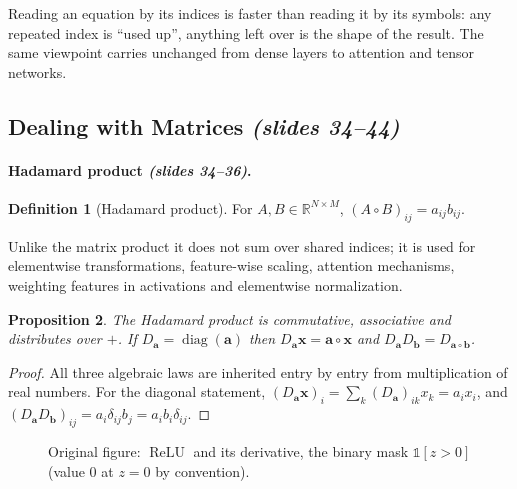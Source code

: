 \documentclass[11pt,a4paper]{article}
\newcommand{\R}{\mathbb{R}}
\newcommand{\diag}{\operatorname{diag}}
\newcommand{\ReLU}{\operatorname{ReLU}}
\newcommand{\ind}[1]{\mathbb{1}\!\left[#1\right]}
\newcommand{\slides}[1]{\texorpdfstring{\emph{(slides #1)}}{(slides #1)}}
\newcommand{\Had}{\circ}
\theoremstyle{definition}
\newtheorem{definition}{Definition}[section]
\theoremstyle{plain}
\newtheorem{proposition}[definition]{Proposition}
\begin{document}
\begin{intuition}
Reading an equation by its indices is faster than reading it by its symbols: any repeated index is ``used up'', anything left over is the shape of the result. The same viewpoint carries unchanged from dense layers to attention and tensor networks.
\end{intuition}

\subsection{Dealing with Matrices \slides{34--44}}

\paragraph{Hadamard product \slides{34--36}.}
\begin{definition}[Hadamard product]
For $A,B\in\R^{N\times M}$, $(A\Had B)_{ij}=a_{ij}b_{ij}$.
\end{definition}

Unlike the matrix product it does not sum over shared indices; it is used for elementwise transformations, feature-wise scaling, attention mechanisms, weighting features in activations and elementwise normalization.

\begin{proposition}\label{prop:hadamard}
The Hadamard product is commutative, associative and distributes over $+$. If $D_{\mathbf a}=\diag(\mathbf a)$ then $D_{\mathbf a}\mathbf x=\mathbf a\Had\mathbf x$ and $D_{\mathbf a}D_{\mathbf b}=D_{\mathbf a\Had\mathbf b}$.
\end{proposition}
\begin{proof}
All three algebraic laws are inherited entry by entry from multiplication of real numbers. For the diagonal statement, $(D_{\mathbf a}\mathbf x)_i=\sum_k(D_{\mathbf a})_{ik}x_k=a_ix_i$, and $(D_{\mathbf a}D_{\mathbf b})_{ij}=a_i\delta_{ij}b_j=a_ib_i\delta_{ij}$.
\end{proof}

\begin{figure}[ht]
\centering
{}
\caption{Original figure: $\ReLU$ and its derivative, the binary mask $\ind{z>0}$ (value $0$ at $z=0$ by convention).}
\end{figure}
\end{document}

